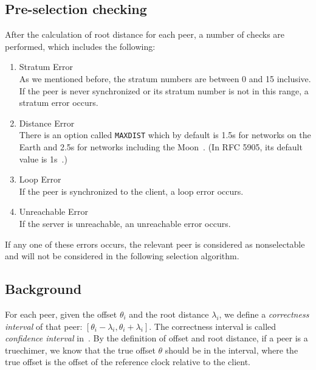 \subsection{Pre-selection checking}%
\label{sub:pre_selection_checking}
After the calculation of root distance for each peer, a number of checks are
performed, which includes the following:
\begin{enumerate}
    \item Stratum Error\\
        As we mentioned before, the stratum numbers are between 0 and 15
        inclusive. If the peer is never synchronized or its stratum number is
        not in this range, a stratum error occurs.
    \item Distance Error\\
        There is an option called \verb|MAXDIST| which by default is 1.5s for
        networks on the Earth and 2.5s for networks including the
        Moon~\cite{clock_selection}. (In RFC 5905, its default value is
        1s~\cite{rfc5905}.)
    \item Loop Error\\
        If the peer is synchronized to the client, a loop error occurs.
    \item Unreachable Error\\
        If the server is unreachable, an unreachable error occurs.
\end{enumerate}
If any one of these errors occurs, the relevant peer is considered as
nonselectable and will not be considered in the following selection
algorithm.

\subsection{Background}%
\label{sub:selection_algorithm_background}

For each peer, given the offset $\theta_i$ and the root distance $\lambda_i$,
we define a \emph{correctness interval} of that peer: $[\theta_i - \lambda_i,
\theta_i + \lambda_i]$. The correctness interval is called \emph{confidence
interval} in~\cite{redbook}. By the definition of offset and root distance, if
a peer is a truechimer, we know that the true offset $\theta$ should be in the
interval, where the true offset is the offset of the reference clock relative
to the client.

